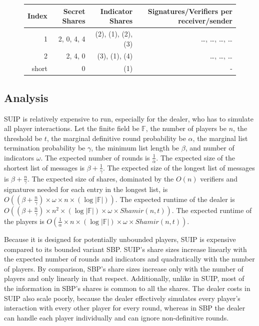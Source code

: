 \documentclass[12pt]{dalcsthesis}
\begin{document}
\begin{figure}
\begin{itemize}
      \begin{tabular}{|r|r|r|r|}
      \hline
        Index & Secret Shares & Indicator Shares & Signatures/Verifiers per receiver/sender \\
      \hline
        1 & 2, 0, 4, 4 & (2), (1), (2), (3) & \ldots, \ldots, \ldots, \ldots\\
      \hline
        2 & 2, 4, 0 & (3), (1), (4) & \ldots, \ldots, \ldots\\
      \hline
        short & 0 & (1) & -\\
      \hline
      \end{tabular}
  \end{itemize}
\end{figure}

\subsection{Analysis}

SUIP is relatively expensive to run, especially for the dealer, who has to simulate all player interactions. Let the finite field be $\mathbb{F}$, the number of players be $n$, the threshold be $t$, the marginal definitive round probability be $\alpha$, the marginal list termination probability be $\gamma$, the minimum list length be $\beta$, and number of indicators $\omega$. The expected number of rounds is $\frac{1}{\alpha}$. The expected size of the shortest list of messages is $\beta + \frac{1}{\gamma}$. The expected size of the longest list of messages is $\beta + \frac{n}{\gamma}$. The expected size of shares, dominated by the $O(n)$ verifiers and signatures needed for each entry in the longest list, is $O((\beta + \frac{n}{\gamma}) \times \omega \times n \times (\log |\mathbb{F}|))$. The expected runtime of the dealer is $O((\beta + \frac{n}{\gamma}) \times n^2 \times (\log |\mathbb{F}|) \times \omega \times Shamir(n, t))$. The expected runtime of the players is $O(\frac{1}{\alpha} \times n \times (\log |\mathbb{F}|) \times \omega \times Shamir(n, t))$.

Because it is designed for potentially unbounded players, SUIP is expensive compared to its bounded variant SBP. SUIP's share sizes increase linearly with the expected number of rounds and indicators and quadratically with the number of players. By comparison, SBP's share sizes increase only with the number of players and only linearly in that respect. Additionally, unlike in SUIP, most of the information in SBP's shares is common to all the shares. The dealer costs in SUIP also scale poorly, because the dealer effectively simulates every player's interaction with every other player for every round, whereas in SBP the dealer can handle each player individually and can ignore non-definitive rounds.
\end{document}
